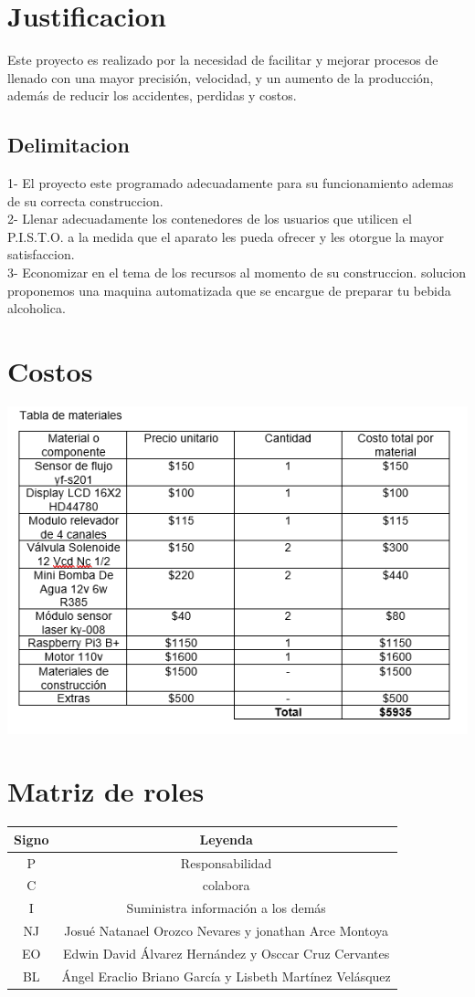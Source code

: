 \documentclass[12pt,a4paper]{report}
\begin{document}
\section{Justificacion}
Este proyecto es realizado por la necesidad de facilitar y mejorar procesos de llenado con una mayor precisión, velocidad, y un aumento de la producción, además de reducir los accidentes, perdidas y costos.

\subsection{Delimitacion}
1- El proyecto este programado adecuadamente para su funcionamiento ademas de su correcta construccion.\\
2- Llenar adecuadamente los contenedores de los usuarios que utilicen el P.I.S.T.O. a la medida que el aparato les pueda ofrecer y les otorgue la mayor satisfaccion.\\
3- Economizar en el tema de los recursos al momento de su construccion.
solucion proponemos una maquina automatizada que se encargue de preparar tu bebida alcoholica.

\section{Costos}
\includegraphics[width=16cm]{Costos.png}

\section{Matriz de roles}
\begin{tabular}{|c|c|}
\hline 
Signo  & Leyenda  \\ 
\hline 
P & Responsabilidad \\ 
\hline 
C & colabora \\ 
\hline 
I & Suministra información a los demás  \\ 
\hline 
NJ & Josué Natanael Orozco Nevares y jonathan Arce Montoya  \\ 
\hline 
EO & Edwin David Álvarez Hernández y Osccar Cruz Cervantes  \\ 
\hline 
BL & Ángel Eraclio Briano García y Lisbeth Martínez Velásquez \\ 
\hline 
\end{tabular} 
\end{document}
